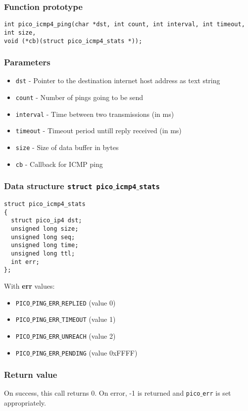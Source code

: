 \subsubsection*{Function prototype}
\begin{verbatim}
int pico_icmp4_ping(char *dst, int count, int interval, int timeout, int size,
void (*cb)(struct pico_icmp4_stats *));
\end{verbatim}

\subsubsection*{Parameters}
\begin{itemize}[noitemsep]
\item \texttt{dst} - Pointer to the destination internet host address as text string
\item \texttt{count} - Number of pings going to be send
\item \texttt{interval} - Time between two transmissions (in ms)
\item \texttt{timeout} - Timeout period untill reply received (in ms)
\item \texttt{size} - Size of data buffer in bytes
\item \texttt{cb} - Callback for ICMP ping
\end{itemize}

\subsubsection*{Data structure \texttt{struct pico$\_$icmp4$\_$stats}}
\begin{verbatim}
struct pico_icmp4_stats
{
  struct pico_ip4 dst;
  unsigned long size;
  unsigned long seq;
  unsigned long time;
  unsigned long ttl;
  int err;
};
\end{verbatim}
With \textbf{err} values:
\begin{itemize}[noitemsep]
\item \texttt{PICO$\_$PING$\_$ERR$\_$REPLIED} (value 0)
\item \texttt{PICO$\_$PING$\_$ERR$\_$TIMEOUT} (value 1)
\item \texttt{PICO$\_$PING$\_$ERR$\_$UNREACH} (value 2)
\item \texttt{PICO$\_$PING$\_$ERR$\_$PENDING} (value 0xFFFF)
\end{itemize}

\subsubsection*{Return value}
On success, this call returns 0.
On error, -1 is returned and \texttt{pico$\_$err} is set appropriately.

